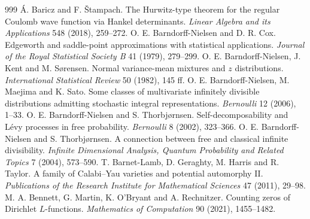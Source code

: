 \begin{thebibliography}{999}
 \'A. Baricz and F. \v{S}tampach. The Hurwitz-type theorem for the regular Coulomb wave function via Hankel determinants. \emph{Linear Algebra and its Applications} 548 (2018), 259--272.
 O. E. Barndorff-Nielsen and D. R. Cox. Edgeworth and saddle-point approximations with statistical applications. \emph{Journal of the Royal Statistical Society B} 41 (1979), 279--299.
 O. E. Barndorff-Nielsen, J. Kent and M. S{\o}rensen. Normal variance-mean mixtures and $z$ distributions. \emph{International Statistical Review} 50 (1982), 145 ff.
 O. E. Barndorff-Nielsen, M. Maejima and K. Sato. Some classes of multivariate infinitely divisible distributions admitting stochastic integral representations. \emph{Bernoulli} 12 (2006), 1--33.
 O. E. Barndorff-Nielsen and S. Thorbj{\o}rnsen. Self-decomposability and L\'evy processes in free probability. \emph{Bernoulli} 8 (2002), 323--366.
 O. E. Barndorff-Nielsen and S. Thorbj{\o}rnsen. A connection between free and classical infinite divisibility. \emph{Infinite Dimensional Analysis, Quantum Probability and Related Topics} 7 (2004), 573--590.
 T. Barnet-Lamb, D. Geraghty, M. Harris and R. Taylor. A family of Calabi--Yau varieties and potential automorphy II. \emph{Publications of the Research Institute for Mathematical Sciences} 47 (2011), 29--98.
 M. A. Bennett, G. Martin, K. O'Bryant and A. Rechnitzer. Counting zeros of Dirichlet $L$-functions. \emph{Mathematics of Computation} 90 (2021), 1455--1482.

\end{thebibliography}
